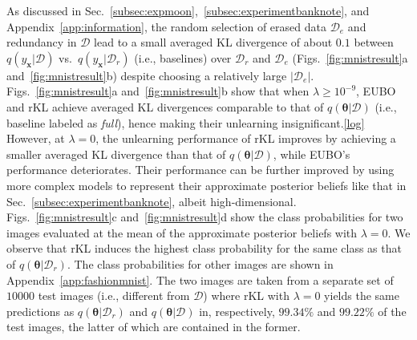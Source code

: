 \documentclass{article}
\theoremstyle{definition}
\newcommand{\mbf}[1]{\mathbf{#1}}
\newcommand{\mcl}[1]{\mathcal{#1}}
\newcommand{\da}{\mcl{D}}
\newcommand{\dc}{\mcl{D}_r}
\newcommand{\dr}{\mcl{D}_e}
\begin{document}
As discussed in Sec.~\ref{subsec:expmoon},~\ref{subsec:experimentbanknote}, and Appendix~\ref{app:information}, the random selection of erased data $\dr$ and  redundancy in $\da$ lead to a small averaged KL divergence of about $0.1$ between $q(y_{\mbf{x}}|\da)$ vs.~$q(y_{\mbf{x}}|\dc)$ (i.e., baselines) over $\dc$ and $\dr$ (Figs.~\ref{fig:mnistresult}a and~\ref{fig:mnistresult}b) despite choosing a relatively large $|\dr|$.
Figs.~\ref{fig:mnistresult}a and~\ref{fig:mnistresult}b  show that when $\lambda \ge 10^{-9}$, EUBO and rKL achieve averaged KL divergences comparable to that of $q(\bm{\theta}|\da)$ (i.e., baseline labeled as \emph{full}), hence making their unlearning insignificant.\cref{log} 
However, at $\lambda = 0$, the unlearning performance of rKL improves by achieving a smaller averaged KL divergence than that of $q(\bm{\theta}|\da)$, while EUBO's performance deteriorates.
Their performance can be further improved by using more complex models to represent their approximate posterior beliefs like that in Sec.~\ref{subsec:experimentbanknote}, albeit high-dimensional.
Figs.~\ref{fig:mnistresult}c and~\ref{fig:mnistresult}d show the class probabilities for two images evaluated at the mean of the approximate posterior beliefs with $\lambda = 0$. 
We observe that rKL induces the highest class probability for the same class as that of
$q(\bm{\theta}|\dc)$.
The class probabilities for other images 
are shown in Appendix~\ref{app:fashionmnist}.
The two images 
are taken from a separate  set of $10000$ test images (i.e., different from $\da$) where rKL with $\lambda = 0$ yields the same predictions as $q(\bm{\theta}|\dc)$ and $q(\bm{\theta}|\da)$ in, respectively, $99.34\%$ and $99.22\%$ of the test images, the latter of which are contained in the former.%
%
%
%
\end{document}
